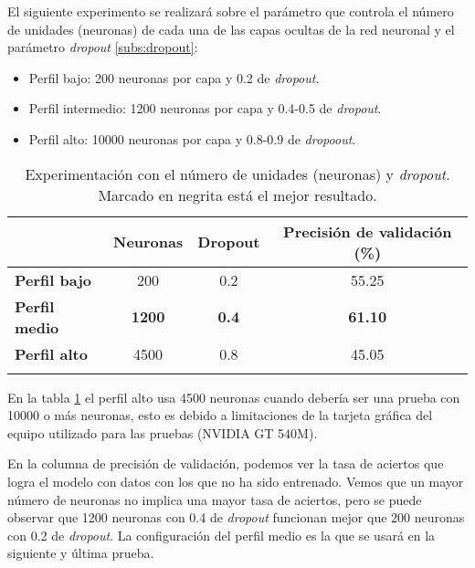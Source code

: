\newpage






El siguiente experimento se realizará sobre el parámetro que controla el número de unidades (neuronas) de cada una de las capas ocultas de la red neuronal y el parámetro \textit{dropout} \ref{subs:dropout}:

\begin{itemize}

	\item Perfil bajo: 200 neuronas por capa y 0.2 de \textit{dropout}.

	\item Perfil intermedio: 1200 neuronas por capa y 0.4-0.5 de \textit{dropout}.

	\item Perfil alto: 10000 neuronas por capa y 0.8-0.9 de \textit{dropoout}.

\end{itemize}


\begin{table}[htp]
\caption{Experimentación con el número de unidades (neuronas) y \textit{dropout}. Marcado en negrita está el mejor resultado.}
\centering
\begin{tabular}{l c c c}
\toprule
& \textbf{Neuronas} & \textbf{Dropout} & \textbf{Precisión de validación (\%)} \\
\midrule
\textbf{Perfil bajo}  & 200   &  0.2  & 55.25  \\
\textbf{Perfil medio} & \textbf{1200}  &  \textbf{0.4}  & \textbf{61.10}  \\
\textbf{Perfil alto}  & 4500  &  0.8  & 45.05  \\

\bottomrule\\

\end{tabular}
\label{tab:perfil}
\end{table}


En la tabla \ref{tab:perfil} el perfil alto usa 4500 neuronas cuando debería ser una prueba con 10000
o más neuronas, esto es debido a limitaciones de la tarjeta gráfica del equipo utilizado para las pruebas (NVIDIA GT 540M).


En la columna de precisión de validación, podemos ver la tasa de aciertos que logra el modelo con datos con los que
no ha sido entrenado. Vemos que un mayor número de neuronas no implica una mayor tasa de aciertos, pero se puede observar que 1200 neuronas con 0.4 de \textit{dropout} funcionan mejor que 200 neuronas con 0.2 de \textit{dropout}.
La configuración del perfil medio es la que se usará en la siguiente y última prueba.


